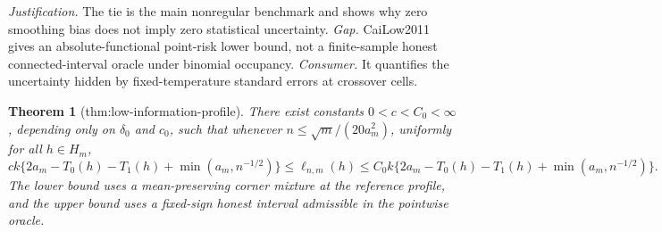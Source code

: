 \documentclass{article}
\newtheorem{theorem}{Theorem}
\begin{document}
\par\smallskip\noindent \textit{Justification.} The tie is the main nonregular benchmark and shows why zero smoothing bias does not imply zero statistical uncertainty. \textit{Gap.} CaiLow2011 gives an absolute-functional point-risk lower bound, not a finite-sample honest connected-interval oracle under binomial occupancy. \textit{Consumer.} It quantifies the uncertainty hidden by fixed-temperature standard errors at crossover cells.

\begin{theorem}[thm:low-information-profile]\label{thm:low-information-profile}
There exist constants \(0<c<C_0<\infty\), depending only on \(\delta_0\) and \(c_0\), such that whenever \(n\le\sqrt m/(20a_m^2)\), uniformly for all \(h\in H_m\), \[ck\{2a_m-T_0(h)-T_1(h)+\min(a_m,n^{-1/2})\}\le\ell_{n,m}(h)\le C_0k\{2a_m-T_0(h)-T_1(h)+\min(a_m,n^{-1/2})\}.\] The lower bound uses a mean-preserving corner mixture at the reference profile, and the upper bound uses a fixed-sign honest interval admissible in the pointwise oracle.
\end{theorem}
\end{document}
